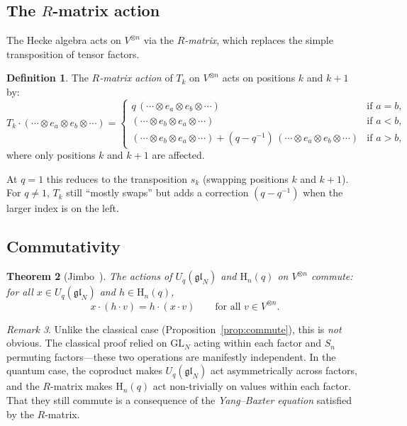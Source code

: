 \documentclass[12pt,a4paper]{article}
\newtheorem{theorem}{Theorem}[section]
\theoremstyle{definition}
\newtheorem{definition}[theorem]{Definition}
\theoremstyle{remark}
\newtheorem{remark}[theorem]{Remark}
\newcommand{\gl}{\mathfrak{gl}}
\begin{document}
\subsection{The $R$-matrix action}

The Hecke algebra acts on $V^{\otimes n}$ via the \emph{$R$-matrix},
which replaces the simple transposition of tensor factors.

\begin{definition}
The \emph{$R$-matrix action} of $T_k$ on $V^{\otimes n}$ acts on
positions $k$ and $k{+}1$ by:
\[
  T_k \cdot (\cdots \otimes e_a \otimes e_b \otimes \cdots)
  = \begin{cases}
    q\, (\cdots \otimes e_a \otimes e_b \otimes \cdots)
      & \text{if } a = b, \\
    (\cdots \otimes e_b \otimes e_a \otimes \cdots)
      & \text{if } a < b, \\
    (\cdots \otimes e_b \otimes e_a \otimes \cdots)
    + (q - q^{-1})\, (\cdots \otimes e_a \otimes e_b \otimes \cdots)
      & \text{if } a > b,
  \end{cases}
\]
where only positions $k$ and $k{+}1$ are affected.
\end{definition}

At $q = 1$ this reduces to the transposition $s_k$ (swapping positions
$k$ and $k{+}1$). For $q \neq 1$, $T_k$ still ``mostly swaps'' but
adds a correction $(q - q^{-1})$ when the larger index is on the left.

\subsection{Commutativity}

\begin{theorem}[Jimbo~\cite{Jimbo}]\label{thm:q-commute}
The actions of $U_q(\gl_N)$ and $\mathrm{H}_n(q)$ on $V^{\otimes n}$
commute: for all $x \in U_q(\gl_N)$ and $h \in \mathrm{H}_n(q)$,
\[
  x \cdot (h \cdot v) = h \cdot (x \cdot v)
  \qquad \text{for all } v \in V^{\otimes n}.
\]
\end{theorem}

\begin{remark}
Unlike the classical case (Proposition~\ref{prop:commute}), this is
\emph{not} obvious. The classical proof relied on $\mathrm{GL}_N$
acting within each factor and $S_n$ permuting factors---these two
operations are manifestly independent. In the quantum case, the
coproduct makes $U_q(\gl_N)$ act asymmetrically across factors, and
the $R$-matrix makes $\mathrm{H}_n(q)$ act non-trivially on values
within each factor. That they still commute is a consequence of the
\emph{Yang--Baxter equation} satisfied by the $R$-matrix.
\end{remark}
\end{document}
